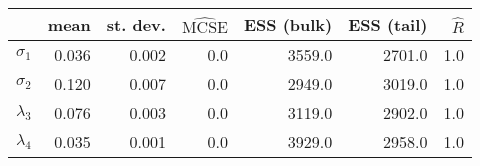 \begin{tabular}{lrrrrrr}
\toprule
{} &   mean &  st. dev. &  $\widehat{\mathrm{MCSE}}$ &  ESS (bulk) &  ESS (tail) &  $\widehat{R}$ \\
\midrule
$\sigma_1$  &  0.036 &     0.002 &                        0.0 &      3559.0 &      2701.0 &            1.0 \\
$\sigma_2$  &  0.120 &     0.007 &                        0.0 &      2949.0 &      3019.0 &            1.0 \\
$\lambda_3$ &  0.076 &     0.003 &                        0.0 &      3119.0 &      2902.0 &            1.0 \\
$\lambda_4$ &  0.035 &     0.001 &                        0.0 &      3929.0 &      2958.0 &            1.0 \\
\bottomrule
\end{tabular}
